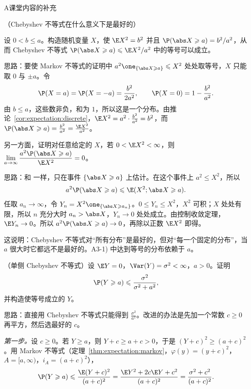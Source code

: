 \begin{exercises}{A}{课堂内容的补充}
\item\label{ex:expectation:A3} （Chebyshev 不等式在什么意义下是最好的）
\begin{questions}
\item 设 $0<b\leqslant a$。构造随机变量 $X$，使 $\E X^2=b^2$ 并且 $\P(\abs X\geqslant a)=b^2/a^2$，从而 Chebyshev 不等式 $\P(\abs X\geqslant a)\leqslant \E X^2/a^2$ 中的等号可以成立。
\begin{solution}
思路：要使 Markov 不等式的证明中 $a^2\one_{\{\abs X\geqslant a\}}\leqslant X^2$ 处处取等号，$X$ 只能取 $0$ 与 $\pm a$。令
\[
\P(X=a)=\P(X=-a)=\frac{b^2}{2a^2},\qquad \P(X=0)=1-\frac{b^2}{a^2}.
\]
由 $b\leqslant a$，这些数非负，和为 $1$，所以这是一个分布。由推论~\ref{cor:expectation:discrete}，$\E X^2=a^2\cdot\frac{b^2}{a^2}=b^2$，而 $\P(\abs X\geqslant a)=\frac{b^2}{a^2}=\frac{\E X^2}{a^2}$。
\end{solution}
\item 另一方面，证明对任意给定的 $X$，若 $0<\E X^2<\infty$，则 $\displaystyle\lim_{a\to\infty}\frac{a^2\P(\abs X\geqslant a)}{\E X^2}=0$。
\begin{solution}
思路：和 一样，只在事件 $\{\abs X\geqslant a\}$ 上估计。在这个事件上 $a^2\leqslant X^2$，所以
\[
a^2\P(\abs X\geqslant a)\leqslant \E(X^2;\abs X\geqslant a).
\]
任取 $a_n\to\infty$，令 $Y_n=X^2\one_{\{\abs X\geqslant a_n\}}$。$0\leqslant Y_n\leqslant X^2$，$X^2$ 可积；$X$ 处处有限，所以 $n$ 充分大时 $a_n>\abs X$，$Y_n\to0$ 处处成立。由控制收敛定理，$\E Y_n\to0$。所以 $a^2\P(\abs X\geqslant a)\to0$，再除以正数 $\E X^2$ 即得。

这说明：Chebyshev 不等式对“所有分布”是最好的，但对“每一个固定的分布”，当 $a$ 很大时它都远不是最好的。A3-1) 中达到等号的分布依赖于 $a$。
\end{solution}
\end{questions}

\item\label{ex:expectation:A4} （单侧 Chebyshev 不等式）设 $\E Y=0$，$\Var(Y)=\sigma^2<\infty$，$a>0$。证明
\[
\P(Y\geqslant a)\leqslant\frac{\sigma^2}{\sigma^2+a^2},
\]
并构造使等号成立的 $Y$。
\begin{solution}
思路：直接用 Chebyshev 不等式只能得到 $\frac{\sigma^2}{a^2}$。改进的办法是先加一个常数 $c\geqslant0$ 再平方，然后选最好的 $c$。

\emph{第一步。}设 $c\geqslant0$。若 $Y\geqslant a$，则 $Y+c\geqslant a+c>0$，于是 $(Y+c)^2\geqslant(a+c)^2$。用 Markov 不等式（定理~\ref{thm:expectation:markov}，$\varphi(y)=(y+c)^2$，$A=[a,\infty)$，$i_A=(a+c)^2$），
\[
\P(Y\geqslant a)\leqslant\frac{\E(Y+c)^2}{(a+c)^2}=\frac{\E Y^2+2c\E Y+c^2}{(a+c)^2}=\frac{\sigma^2+c^2}{(a+c)^2}.
\]


\end{solution}
\end{exercises}
